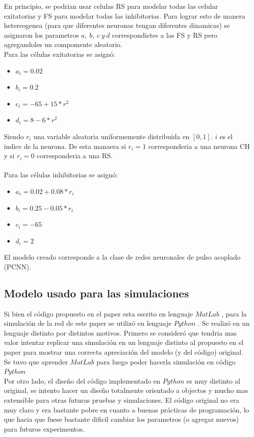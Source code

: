 \documentclass[12pt]{article}
\begin{document}
En principio, se podrian usar celulas RS para modelar todas las celular exitatorias y FS para modelar todas las inhibitorias. Para lograr esto de manera hetereogenea (para que diferentes neuronas tengan diferentes dinamicas)
se asignaron los parametros $a, \ b, \ c \ y \ d$ correspondietes a las FS y RS pero agregandoles un compomente aleatorio. \\
Para las células exitatorias se asignó:
\begin{itemize}
    \item $a_i = 0.02$
    \item $b_i = 0.2$
    \item $c_i = -65 + 15 * r^2$
    \item $d_i = 8 - 6 * r^2$
\end{itemize}

Siendo $r_i$ una variable aleatoria uniformemente distribuida en $[0,1 ]$. $i$ es el indice de la neurona. De esta manaera si $r_i = 1$ corresponderia a una neurona CH y si $r_i = 0$ corresponderia a una RS.\\
\\
Para las células inhibitorias se asignó:
\begin{itemize}
    \item $a_i = 0.02 + 0.08 * r_i$
    \item $b_i = 0.25 - 0.05 * r_i$
    \item $c_i = -65$
    \item $d_i = 2$
\end{itemize}

El modelo creado corresponde a la clase de redes neuronales de pulso acoplado (PCNN).
\newpage
\subsection{Modelo usado para las simulaciones}
Si bien el código propuesto en el paper esta escrito en lenguaje $MatLab$ \cite{MatLab}, para la simulación de la red de este paper se utilizó en lenguaje $Python$ \cite{Python}.
Se realizó en un lenguaje distinto por distintos motivos. Primero se consideró que tendria mas valor intentar replicar una simulación en un lenguaje distinto al propuesto en el paper
para mostrar una correcta apreciación del modelo (y del código) original. Se tuvo que aprender $MatLab$ para luego poder hacerla simulación en código $Python$ \\
Por otro lado, el diseño del código implementado en $Python$ es muy distinto al original, se intento hacer un diseño totalmente orientado a objectos y mucho mas extensible para otras futuras pruebas y simulaciones.
El código original no era muy claro y era bastante pobre en cuanto a buenas prácticas de programación, lo que hacia que fuese bastante dificil cambiar los parametros (o agregar nuevos) para futuros experimentos.
\end{document}
